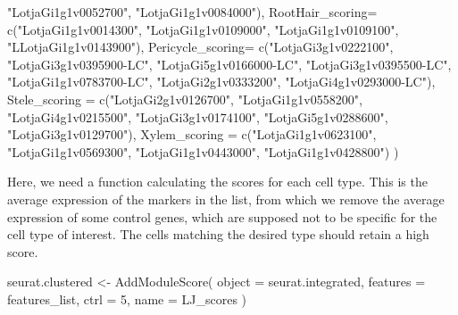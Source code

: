 \documentclass[
  letterpaper,
  DIV=11,
  numbers=noendperiod]{scrartcl}
\newenvironment{Shaded}{\begin{snugshade}}{\end{snugshade}}
\newcommand{\AttributeTok}[1]{\textcolor[rgb]{0.40,0.45,0.13}{#1}}
\newcommand{\DecValTok}[1]{\textcolor[rgb]{0.68,0.00,0.00}{#1}}
\newcommand{\FunctionTok}[1]{\textcolor[rgb]{0.28,0.35,0.67}{#1}}
\newcommand{\NormalTok}[1]{\textcolor[rgb]{0.00,0.23,0.31}{#1}}
\newcommand{\OtherTok}[1]{\textcolor[rgb]{0.00,0.23,0.31}{#1}}
\newcommand{\StringTok}[1]{\textcolor[rgb]{0.13,0.47,0.30}{#1}}
\begin{document}
\begin{Shaded}
\begin{Highlighting}[]
                           \StringTok{"LotjaGi1g1v0052700"}\NormalTok{,}
                           \StringTok{"LotjaGi1g1v0084000"}\NormalTok{),}
    \StringTok{\textquotesingle{}RootHair\_scoring\textquotesingle{}}\OtherTok{=} \FunctionTok{c}\NormalTok{(}\StringTok{"LotjaGi1g1v0014300"}\NormalTok{,}
                   \StringTok{"LotjaGi1g1v0109000"}\NormalTok{,}
                   \StringTok{"LotjaGi1g1v0109100"}\NormalTok{,}
                   \StringTok{"LLotjaGi1g1v0143900"}\NormalTok{),  }
    \StringTok{\textquotesingle{}Pericycle\_scoring\textquotesingle{}}\OtherTok{=} \FunctionTok{c}\NormalTok{(}\StringTok{"LotjaGi3g1v0222100"}\NormalTok{,}
                   \StringTok{"LotjaGi3g1v0395900{-}LC"}\NormalTok{,}
                   \StringTok{"LotjaGi5g1v0166000{-}LC"}\NormalTok{,}
                   \StringTok{"LotjaGi3g1v0395500{-}LC"}\NormalTok{,}
                   \StringTok{"LotjaGi1g1v0783700{-}LC"}\NormalTok{,}
                   \StringTok{"LotjaGi2g1v0333200"}\NormalTok{,}
                   \StringTok{"LotjaGi4g1v0293000{-}LC"}\NormalTok{),     }
    \StringTok{\textquotesingle{}Stele\_scoring\textquotesingle{}} \OtherTok{=} \FunctionTok{c}\NormalTok{(}\StringTok{"LotjaGi2g1v0126700"}\NormalTok{,}
                \StringTok{"LotjaGi1g1v0558200"}\NormalTok{,}
                \StringTok{"LotjaGi4g1v0215500"}\NormalTok{,}
                \StringTok{"LotjaGi3g1v0174100"}\NormalTok{,}
                \StringTok{"LotjaGi5g1v0288600"}\NormalTok{,}
                \StringTok{"LotjaGi3g1v0129700"}\NormalTok{),}
    \StringTok{\textquotesingle{}Xylem\_scoring\textquotesingle{}} \OtherTok{=} \FunctionTok{c}\NormalTok{(}\StringTok{"LotjaGi1g1v0623100"}\NormalTok{,}
                \StringTok{"LotjaGi1g1v0569300"}\NormalTok{,}
                \StringTok{"LotjaGi1g1v0443000"}\NormalTok{,}
                \StringTok{"LotjaGi1g1v0428800"}\NormalTok{)}
\NormalTok{    )}
\end{Highlighting}
\end{Shaded}

Here, we need a function calculating the scores for each cell type. This
is the average expression of the markers in the list, from which we
remove the average expression of some control genes, which are supposed
not to be specific for the cell type of interest. The cells matching the
desired type should retain a high score.

\begin{Shaded}
\begin{Highlighting}[]
\NormalTok{seurat.clustered }\OtherTok{\textless{}{-}} \FunctionTok{AddModuleScore}\NormalTok{(}
  \AttributeTok{object =}\NormalTok{ seurat.integrated,}
  \AttributeTok{features =}\NormalTok{ features\_list,}
  \AttributeTok{ctrl =} \DecValTok{5}\NormalTok{,}
  \AttributeTok{name =} \StringTok{\textquotesingle{}LJ\_scores\textquotesingle{}}
\NormalTok{)}
\end{Highlighting}
\end{Shaded}
\end{document}
